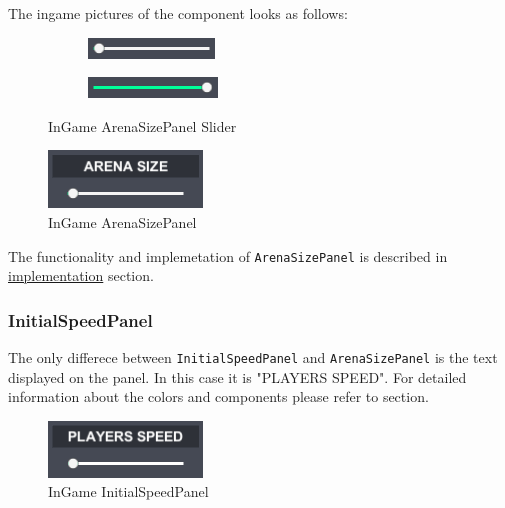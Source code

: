 \noindent The ingame pictures of the component looks as follows:

\begin{figure}[h] 
	\centering
	\begin{subfigure}{0.2\textwidth}
		\centering
		\includegraphics[scale=1, frame]{gui-imgs/slider0}
	\end{subfigure}
	\begin{subfigure}{0.2\textwidth}
		\centering
		\includegraphics[scale=1, frame]{gui-imgs/slider1}
	\end{subfigure}
	\caption{InGame ArenaSizePanel Slider}
\end{figure}

\begin{figure}[h!] 
	\centering
	\includegraphics[scale=1, frame]{gui-imgs/arenasizepanel}
	\caption{InGame ArenaSizePanel}
\end{figure}

\noindent The functionality and implemetation of \verb+ArenaSizePanel+ is described in \hyperref[gui-implementation]{implementation} section.

\subsubsection{InitialSpeedPanel}\label{gui-initialspeedpanel}
\noindent The only differece between \verb+InitialSpeedPanel+ and \verb+ArenaSizePanel+ is the text displayed on the panel. In this case it is "PLAYERS SPEED". For detailed information about the colors and components please refer to  section.

\begin{figure}[h!] 
	\centering
	\includegraphics[scale=1, frame]{gui-imgs/initialspeedpanel}
	\caption{InGame InitialSpeedPanel}
\end{figure}

